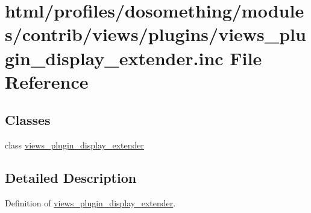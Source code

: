 \hypertarget{views__plugin__display__extender_8inc}{
\section{html/profiles/dosomething/modules/contrib/views/plugins/views\_\-plugin\_\-display\_\-extender.inc File Reference}
\label{views__plugin__display__extender_8inc}
}
\subsection*{Classes}
\begin{DoxyCompactItemize}
\item 
class \hyperlink{classviews__plugin__display__extender}{views\_\-plugin\_\-display\_\-extender}
\end{DoxyCompactItemize}


\subsection{Detailed Description}
Definition of \hyperlink{classviews__plugin__display__extender}{views\_\-plugin\_\-display\_\-extender}. 